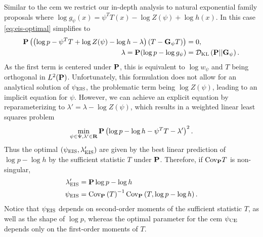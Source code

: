 Similar to the \gls{cem} we restrict our in-depth analysis to natural exponential family proposals where $\log g_{\psi}(x) = \psi^{T}T(x) - \log Z(\psi) + \log h(x)$. In this case \cref{eq:eis-optimal} simplifies to
\begin{align*}
    \P \left(\left( \log p - \psi^{T}T + \log Z(\psi) - \log h - \lambda \right)(T - \G_{\psi} T)\right) &= 0,\\
    \lambda = \P (\log p - \log g_{\psi}) &= \Dkl{\P}{\G_{\psi}}.
\end{align*}
As the first term is centered under $\P$, this is equivalent to $\log w_{\psi}$ and $T$ being orthogonal in $L^{2}(\P)$. 
Unfortunately, this formulation does not allow for an analytical solution of $\peis$, the problematic term being $\log Z(\psi)$, leading to an implicit equation for $\psi$. However, we can achieve an explicit equation by reparameterizing to $\lambda' = \lambda - \log Z(\psi)$, which results in a weighted linear least squares problem
\begin{align*}
    \min_{\psi \in \Psi, \lambda' \in \R} \P \left(\log p - \log h - \psi^{T}T - \lambda'\right)^{2}.
\end{align*}
Thus the optimal $ \left( \peis, \lambda'_{\text{EIS}} \right)$ are given by the best linear prediction of $\log p - \log h$ by the sufficient statistic $T$ under $\P$. Therefore, if $\cov_{\P} T$ is non-singular, 
\begin{align}
    \lambda'_{\text{EIS}} &= \P \log p - \log h \nonumber{}\\
    \label{eq:peis-analytical}
    \peis &= \cov_{\P} \left( T \right)^{-1} \cov_{\P} \left(T, \log p - \log h \right).
\end{align}
Notice that $\peis$ depends on second-order moments of the sufficient statistic $T$, as well as the shape of $\log p$, whereas the optimal parameter for the \gls{cem} $\pce$ depends only on the first-order moments of $T$. 

